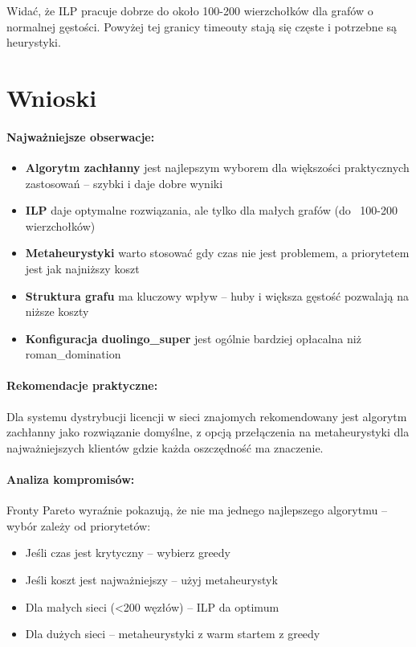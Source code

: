 Widać, że ILP pracuje dobrze do około 100-200 wierzchołków dla grafów o normalnej gęstości. Powyżej tej granicy timeouty stają się częste i potrzebne są heurystyki.

\section{Wnioski}

\paragraph{Najważniejsze obserwacje:}
\begin{itemize}
  \item \textbf{Algorytm zachłanny} jest najlepszym wyborem dla większości praktycznych zastosowań -- szybki i daje dobre wyniki
  \item \textbf{ILP} daje optymalne rozwiązania, ale tylko dla małych grafów (do ~100-200 wierzchołków)
  \item \textbf{Metaheurystyki} warto stosować gdy czas nie jest problemem, a priorytetem jest jak najniższy koszt
  \item \textbf{Struktura grafu} ma kluczowy wpływ -- huby i większa gęstość pozwalają na niższe koszty
  \item \textbf{Konfiguracja duolingo\_super} jest ogólnie bardziej opłacalna niż roman\_domination
\end{itemize}

\paragraph{Rekomendacje praktyczne:}
Dla systemu dystrybucji licencji w sieci znajomych rekomendowany jest algorytm zachłanny jako rozwiązanie domyślne, z opcją przełączenia na metaheurystyki dla najważniejszych klientów gdzie każda oszczędność ma znaczenie.

\paragraph{Analiza kompromisów:}
Fronty Pareto wyraźnie pokazują, że nie ma jednego najlepszego algorytmu -- wybór zależy od priorytetów:
\begin{itemize}
  \item Jeśli czas jest krytyczny -- wybierz greedy
  \item Jeśli koszt jest najważniejszy -- użyj metaheurystyk
  \item Dla małych sieci (<200 węzłów) -- ILP da optimum
  \item Dla dużych sieci -- metaheurystyki z warm startem z greedy
\end{itemize}
